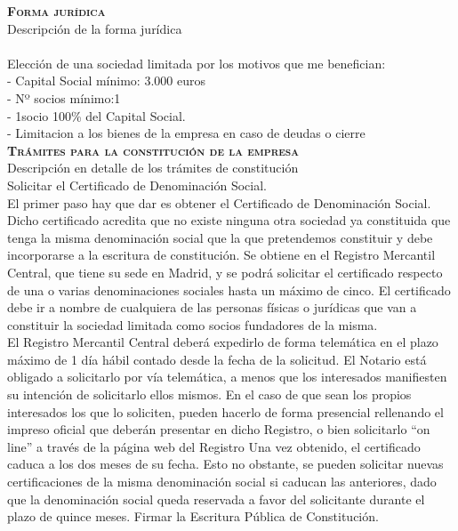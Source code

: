 \textbf{\textsc{Forma jurídica}}\\
Descripción de la forma jurídica\\
\\
Elección de una sociedad limitada por los motivos que me benefician:\\
- Capital Social mínimo: 3.000 euros  \\

- Nº socios mínimo:1 \\
- 1socio 100\% del Capital Social.\\
- Limitacion a los bienes de la empresa en caso de deudas o cierre \\


\textbf{\textsc{Trámites para la constitución de la empresa}}\\
Descripción en detalle de los trámites de constitución\\
Solicitar el Certificado de Denominación Social.\\

El primer paso hay que dar es obtener el Certificado de Denominación Social. Dicho certificado acredita que no existe ninguna otra sociedad ya constituida que tenga la misma denominación social que la que pretendemos constituir y debe incorporarse a la escritura de constitución.
Se obtiene en el Registro Mercantil Central, que tiene su sede en Madrid, y se podrá solicitar el certificado respecto de una o varias denominaciones sociales hasta un máximo de cinco. El certificado debe ir a nombre de cualquiera de las personas físicas o jurídicas que van a constituir la sociedad limitada como socios fundadores de la misma.\\

El Registro Mercantil Central deberá expedirlo de forma telemática en el plazo máximo de 1 día hábil contado desde la fecha de la solicitud.
El Notario está obligado a solicitarlo por vía telemática, a menos que los interesados manifiesten su intención de solicitarlo ellos mismos.
En el caso de que sean los propios interesados los que lo soliciten, pueden hacerlo de forma presencial rellenando el impreso oficial que deberán presentar en dicho Registro, o bien solicitarlo “on line” a través de la página web del Registro 
Una vez obtenido, el certificado caduca a los dos meses de su fecha. Esto no obstante, se pueden solicitar nuevas certificaciones de la misma denominación social si caducan las anteriores, dado que la denominación social queda reservada a favor del solicitante durante el plazo de quince meses.
Firmar la Escritura Pública de Constitución.\\

